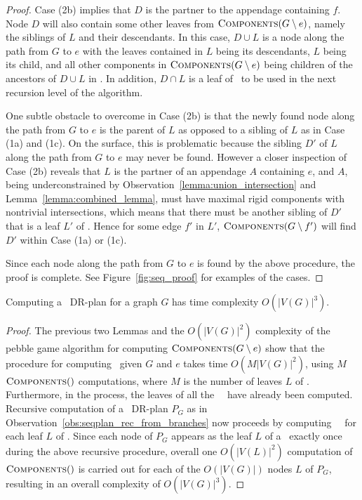 \begin{proof}
    Case (2b) implies that $D$ is the partner to the appendage containing $f$. Node $D$ will also contain some other leaves from $\textsc{Components}(G\setminus e)$, namely the siblings of $L$ and their descendants. In this case, $D\cup L$ is a node along the path from $G$ to $e$ with the leaves contained in $L$ being its descendants, $L$ being its child, and all other components in $\textsc{Components}(G\setminus e)$ being children of the ancestors of $D\cup L$ in \branchGePG. In addition, $D\cap L$ is a leaf of \branchLfPL\ to be used in the next recursion level of the algorithm.

    One subtle obstacle to overcome in Case (2b) is that the newly found node along the path from $G$ to $e$ is the parent of $L$ as opposed to a sibling of $L$ as in Case (1a) and (1c). On the surface, this is problematic because the sibling $D'$ of $L$ along the path from $G$ to $e$ may never be found. However a closer inspection of Case (2b) reveals that $L$ is the partner of an appendage $A$ containing $e$, and $A$, being underconstrained by Observation~\ref{lemma:union_intersection} and Lemma~\ref{lemma:combined_lemma}, must have maximal rigid components with nontrivial intersections, which means that there must be another sibling of $D'$ that is a leaf $L'$ of \branchGePG. Hence for some edge $f'$ in $L'$, $\textsc{Components}(G\setminus f')$ will find $D'$ within Case (1a) or (1c).

    Since each node along the path from $G$ to $e$ is found by the above procedure, the proof is complete.
    See Figure~\ref{fig:seq_proof} for examples of the cases.
\end{proof}


\begin{theorem}
\label{theorem:algo_complexity}
    Computing a \pseudosequential\ DR-plan for a graph $G$ has time complexity $O(|V(G)|^3)$.
\end{theorem}

\begin{proof}
    The previous two Lemmas and the $O(|V(G)|^2)$ complexity of the pebble game algorithm for computing $\textsc{Components}(G\setminus e)$ show that the procedure for computing \branchGePG\ given $G$ and $e$ takes time $O(M|V(G)|^2)$, using $M$ $\textsc{Components}()$ computations, where $M$ is the number of leaves $L$ of \branchGePG. Furthermore, in the process, the leaves of all the \branches\ \branchLfPL\ have already been computed. Recursive computation of a \pseudosequential\ DR-plan $P_G$ as in Observation~\ref{obs:seqplan_rec_from_branches} now proceeds by computing \branches\ \branchLfPL\ for each leaf $L$ of \branchGePG. Since each node of $P_G$ appears as the leaf $L$ of a \branch\ exactly once during the above recursive procedure, overall one $O(|V(L)|^2)$ computation of $\textsc{Components}()$ is carried out for each of the $O(|V(G)|)$ nodes $L$ of $P_G$, resulting in an overall complexity of $O(|V(G)|^3)$.
\end{proof}



